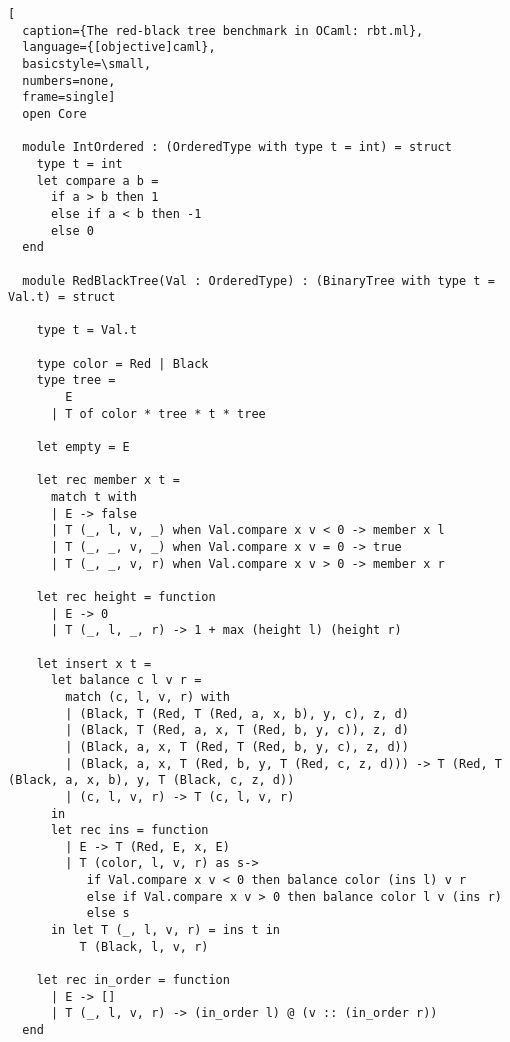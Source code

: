 \begin{lstlisting}[
  caption={The red-black tree benchmark in OCaml: rbt.ml},
  language={[objective]caml},
  basicstyle=\small,
  numbers=none,
  frame=single]
  open Core

  module IntOrdered : (OrderedType with type t = int) = struct
    type t = int
    let compare a b =
      if a > b then 1
      else if a < b then -1
      else 0
  end

  module RedBlackTree(Val : OrderedType) : (BinaryTree with type t = Val.t) = struct

    type t = Val.t

    type color = Red | Black
    type tree =
        E
      | T of color * tree * t * tree

    let empty = E

    let rec member x t =
      match t with
      | E -> false
      | T (_, l, v, _) when Val.compare x v < 0 -> member x l
      | T (_, _, v, _) when Val.compare x v = 0 -> true
      | T (_, _, v, r) when Val.compare x v > 0 -> member x r

    let rec height = function
      | E -> 0
      | T (_, l, _, r) -> 1 + max (height l) (height r)

    let insert x t =
      let balance c l v r =
        match (c, l, v, r) with
        | (Black, T (Red, T (Red, a, x, b), y, c), z, d)
        | (Black, T (Red, a, x, T (Red, b, y, c)), z, d)
        | (Black, a, x, T (Red, T (Red, b, y, c), z, d))
        | (Black, a, x, T (Red, b, y, T (Red, c, z, d))) -> T (Red, T (Black, a, x, b), y, T (Black, c, z, d))
        | (c, l, v, r) -> T (c, l, v, r)
      in
      let rec ins = function
        | E -> T (Red, E, x, E)
        | T (color, l, v, r) as s->
           if Val.compare x v < 0 then balance color (ins l) v r
           else if Val.compare x v > 0 then balance color l v (ins r)
           else s
      in let T (_, l, v, r) = ins t in 
          T (Black, l, v, r)

    let rec in_order = function
      | E -> []
      | T (_, l, v, r) -> (in_order l) @ (v :: (in_order r))
  end
\end{lstlisting}

